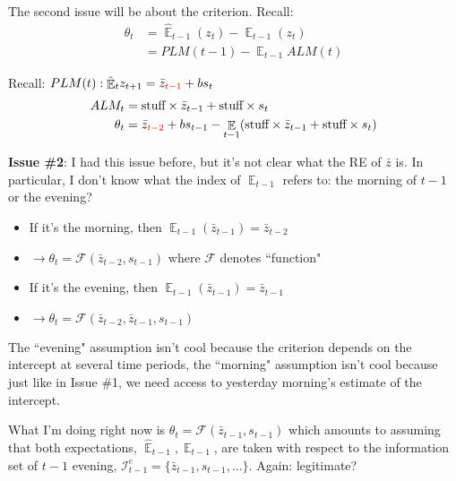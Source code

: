 \documentclass[11pt]{article}
\renewcommand{\[}{\begin{equation}}
\renewcommand{\]}{\end{equation}}
\DeclareMathOperator{\E}{\mathbb{E}}
\begin{document}
The second issue will be about the criterion. Recall:
\begin{align*}
\theta_t &=  \hat{\E}_{t-1}(z_{t}) - \E_{t-1}(z_{t})  \\
& = PLM(t-1) - \E_{t-1}ALM(t)
\end{align*}

 Recall: $PLM(t): \hat{\E}_t z_{t+1} = \bar{z}_{\color{red}{t-1}} + bs_t$
\begin{align*}
ALM_t & = \text{stuff} \times \bar{z}_{t-1} + \text{stuff} \times s_t \\
\theta_t &= \bar{z}_{\color{red}{t-2}} + bs_{t-1} - \E_{t-1}( \text{stuff} \times \bar{z}_{t-1} + \text{stuff} \times s_t)
\end{align*}

\textbf{Issue \#2}: I had this issue before, but it's not clear what the RE of $\bar{z}$ is. In particular, I don't know what the index of $\E_{t-1}$ refers to: the morning of $t-1$ or the evening?
\begin{itemize}
\item If it's the morning, then $ \E_{t-1}(\bar{z}_{t-1}) =  \bar{z}_{t-2}$
\item[] $\rightarrow \theta_t = \mathcal{F}(\bar{z}_{t-2}, s_{t-1})$ where $ \mathcal{F}$ denotes ``function"
\item If it's the evening, then $ \E_{t-1}(\bar{z}_{t-1}) =  \bar{z}_{t-1}$
\item[] $\rightarrow \theta_t =  \mathcal{F}(\bar{z}_{t-2}, \bar{z}_{t-1}, s_{t-1})$
\end{itemize}

The ``evening" assumption isn't cool because the criterion depends on the intercept at several time periods, the ``morning" assumption isn't cool because just like in Issue \#1, we need access to yesterday morning's estimate of the intercept. 

What I'm doing right now is $\theta_t =  \mathcal{F}(\bar{z}_{t-1}, s_{t-1})$ which amounts to assuming that both expectations, $\hat{\E}_{t-1}, \E_{t-1}$, are taken with respect to the information set of $t-1$ evening, $\mathcal{I}_{t-1}^e = \{ \bar{z}_{t-1}, s_{t-1}, \dots\}$. Again: legitimate?
\end{document}

